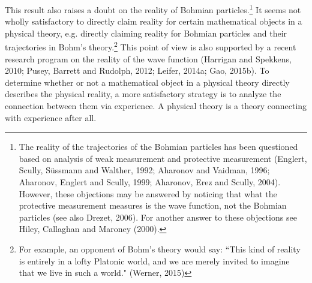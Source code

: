 This result also raises a doubt on the reality of Bohmian particles.\footnote{The reality of the trajectories of the Bohmian particles has been questioned based on analysis of weak measurement and protective measurement (Englert, Scully, S\"{u}ssmann and Walther, 1992; Aharonov and Vaidman, 1996; Aharonov, Englert and Scully, 1999; Aharonov, Erez and Scully, 2004). However, these objections may be answered by noticing that what the protective measurement measures is the wave function, not the Bohmian particles (see also Drezet, 2006). For another answer to these objections see Hiley, Callaghan and Maroney (2000).}
It seems not wholly satisfactory to directly claim reality for certain mathematical objects in a physical theory, e.g. directly claiming reality for Bohmian particles and their trajectories in Bohm's theory.\footnote{For example, an opponent of Bohm's theory would say: ``This kind of reality is entirely in a lofty Platonic world, and we are merely invited to imagine that we live in such a world." (Werner, 2015)}
This point of view is also supported by a recent research program on the reality of the wave function (Harrigan and Spekkens, 2010; Pusey, Barrett and Rudolph, 2012; Leifer, 2014a; Gao, 2015b).
To determine whether or not a mathematical object in a physical theory directly describes the physical reality, a more satisfactory strategy is to analyze the connection between them via experience.
A physical theory is a theory connecting with experience after all.

